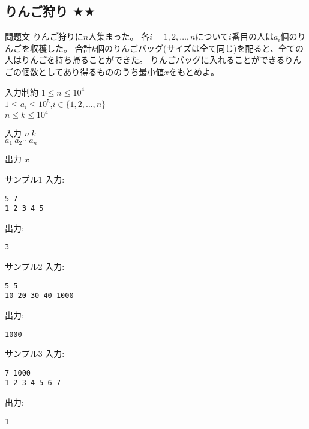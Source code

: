 \documentclass[a4paper,twoside,onecolumn,openany,article,10pt]{memoir}
\theoremstyle{remark}
\begin{document}
\clearpage
\subsection{りんご狩り $\bigstar\bigstar$}
\begin{itembox}[l]{問題文}
りんご狩りに$n$人集まった。
各$i=1,2,\dotsc,n$について$i$番目の人は$a_i$個のりんごを収穫した。
合計$k$個のりんごバッグ(サイズは全て同じ)を配ると、全ての人はりんごを持ち帰ることができた。
りんごバッグに入れることができるりんごの個数としてあり得るもののうち最小値$x$をもとめよ。
\end{itembox}

\begin{itembox}[l]{入力制約}
$1\le n\le 10^4$\\
$1\le a_i\le 10^5$,\hspace{2em}$i\in\{1,2,\dotsc,n\}$\\
$n\le k\le 10^4$
\end{itembox}

\begin{itembox}[l]{入力}
$n~k$\\
$a_1~a_2 \dotsb a_n$
\end{itembox}

\begin{itembox}[l]{出力}
$x$
\end{itembox}

\begin{itembox}[l]{サンプル1}
入力:
\begin{verbatim}
5 7
1 2 3 4 5
\end{verbatim}
出力:
\begin{verbatim}
3
\end{verbatim}
\end{itembox}

\begin{itembox}[l]{サンプル2}
入力:
\begin{verbatim}
5 5
10 20 30 40 1000
\end{verbatim}
出力:
\begin{verbatim}
1000
\end{verbatim}
\end{itembox}

\begin{itembox}[l]{サンプル3}
入力:
\begin{verbatim}
7 1000
1 2 3 4 5 6 7
\end{verbatim}
出力:
\begin{verbatim}
1
\end{verbatim}
\end{itembox}
\end{document}
